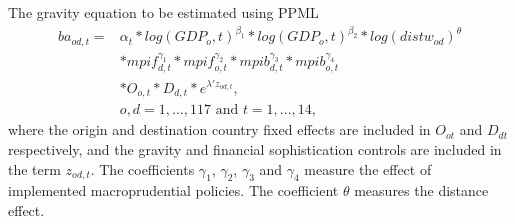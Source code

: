 \documentclass{beamer}
\begin{document}

\begin{frame}{The gravity equation to be estimated using PPML}
\begin{align}
ba_{od,t} = & \alpha_t * log(GDP_o,t)^{\beta_1} * log(GDP_o,t)^{\beta_2} * log(distw_{od})^{\theta} \nonumber \\
& * mpif_{d,t}^{\gamma_1} * mpif_{o,t}^{\gamma_2} * mpib_{d,t}^{\gamma_3} * mpib_{o,t}^{\gamma_4} \nonumber \\
& * O_{o,t} * D_{d,t} * e^{\lambda'z_{od,t}}, \\
& o, d=1, ..., 117 \text{ and } t=1, ..., 14, \nonumber
\label{eq:gravity}
\end{align}
where the origin and destination country fixed effects are included in $O_{ot}$ and $D_{dt}$ respectively, and the gravity and financial sophistication controls are included in the term $z_{od,t}$. The coefficients $\gamma_1$, $\gamma_2$, $\gamma_3$ and $\gamma_4$ measure the effect of implemented macroprudential policies. The coefficient $\theta$ measures the distance effect.
\end{frame}

\end{document}

